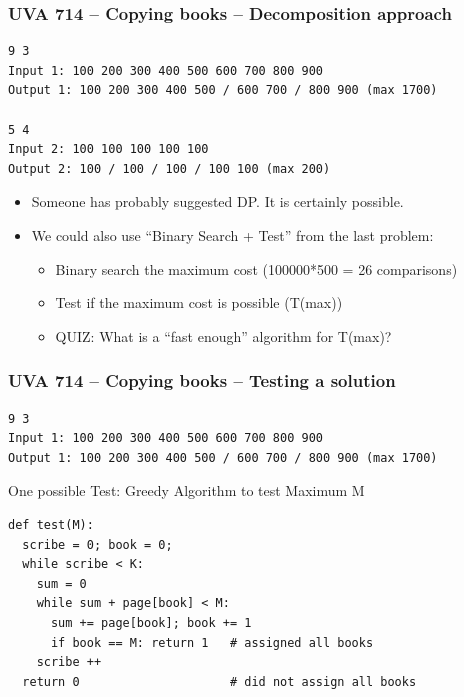 \begin{frame}[fragile]
  \frametitle{UVA 714 -- Copying books -- Decomposition approach}

\begin{verbatim}
9 3
Input 1: 100 200 300 400 500 600 700 800 900
Output 1: 100 200 300 400 500 / 600 700 / 800 900 (max 1700)

5 4
Input 2: 100 100 100 100 100
Output 2: 100 / 100 / 100 / 100 100 (max 200)
\end{verbatim}

\vfill

    \begin{itemize}
    \item Someone has probably suggested DP. It is certainly possible.
    \item We could also use ``Binary Search + Test'' from the last problem:
      \begin{itemize}
      \item Binary search the maximum cost (100000*500 = 26 comparisons)
      \item Test if the maximum cost is possible (T(max))
      \item \alert{QUIZ:} What is a ``fast enough'' algorithm for T(max)?
      \end{itemize}
    \end{itemize}
\end{frame}

\begin{frame}[fragile]
  \frametitle{UVA 714 -- Copying books -- Testing a solution}
  {\smaller

\begin{verbatim}
9 3
Input 1: 100 200 300 400 500 600 700 800 900
Output 1: 100 200 300 400 500 / 600 700 / 800 900 (max 1700)
\end{verbatim}

\vfill

\begin{block}{One possible Test: Greedy Algorithm to test Maximum M}
\begin{verbatim}
def test(M):
  scribe = 0; book = 0;
  while scribe < K:
    sum = 0
    while sum + page[book] < M:
      sum += page[book]; book += 1
      if book == M: return 1   # assigned all books
    scribe ++
  return 0                     # did not assign all books
\end{verbatim}
\end{block}

  }
\end{frame}

